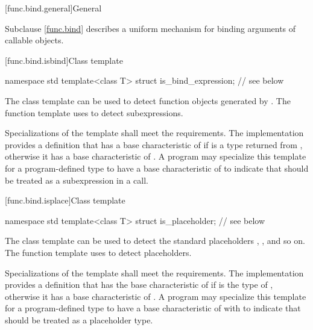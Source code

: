 [func.bind.general]{General}%

\pnum
Subclause \ref{func.bind} describes a uniform mechanism for binding
arguments of callable objects.

[func.bind.isbind]{Class template }

%
\begin{codeblock}
namespace std {
  template<class T> struct is_bind_expression;  // see below
}
\end{codeblock}

\pnum
The class template  can be used to detect function objects
generated by . The function template 
uses  to detect subexpressions.

\pnum
Specializations of the  template shall meet
the  requirements. The implementation
provides a definition that has a base characteristic of
 if  is a type returned from ,
otherwise it has a base characteristic of .
A program may specialize this template for a program-defined type 
to have a base characteristic of  to indicate that
 should be treated as a subexpression in a  call.

[func.bind.isplace]{Class template }

%
\begin{codeblock}
namespace std {
  template<class T> struct is_placeholder;      // see below
}
\end{codeblock}

\pnum
{}%
%
%
%
%
%
%
%
%
%
%
The class template  can be used to detect the standard placeholders
, , and so on.
The function template  uses
 to detect placeholders.

\pnum
Specializations of the  template shall meet
the  requirements. The implementation
provides a definition that has the base characteristic of
 if  is the type of
, otherwise it has a
base characteristic of . A program
may specialize this template for a program-defined type  to
have a base characteristic of 
with  to indicate that  should be
treated as a placeholder type.

